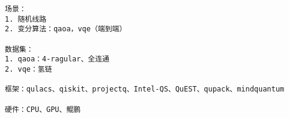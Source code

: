 \begin{lstlisting}
场景：
1. 随机线路
2. 变分算法：qaoa，vqe（端到端）

数据集：
1. qaoa：4-ragular、全连通
2. vqe：氢链

框架：qulacs、qiskit、projectq、Intel-QS、QuEST、qupack、mindquantum

硬件：CPU、GPU、鲲鹏
\end{lstlisting}